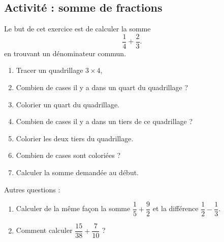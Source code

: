 
\subsection*{Activité : somme de fractions}

Le but de cet exercice est de calculer la somme
\begin{equation}
    \frac{1}{ 4 }+\frac{ 2 }{ 3 }.
\end{equation}
en trouvant un dénominateur commun.

\begin{enumerate}
    \item
        Tracer un quadrillage \( 3\times 4\),
    \item
        Combien de cases il y a dans un quart du quadrillage ?
    \item
        Colorier un quart du quadrillage.
    \item
        Combien de cases il y a dans un tiers de ce quadrillage ?
    \item
        Colorier les deux tiers du quadrillage.
    \item
        Combien de cases sont coloriées ?
    \item
        Calculer la somme demandée au début.
\end{enumerate}

Autres questions :
\begin{enumerate}
    \item
        
Calculer de la même façon la somme \( \dfrac{ 1 }{ 5 }+\dfrac{ 9 }{ 2 }\) et la différence \( \dfrac{ 1 }{ 2 }-\dfrac{ 1 }{ 3 }\).
 \item
     Comment calculer \( \dfrac{ 15 }{ 38 }+\dfrac{ 7 }{ 10 }\) ?
\end{enumerate}
